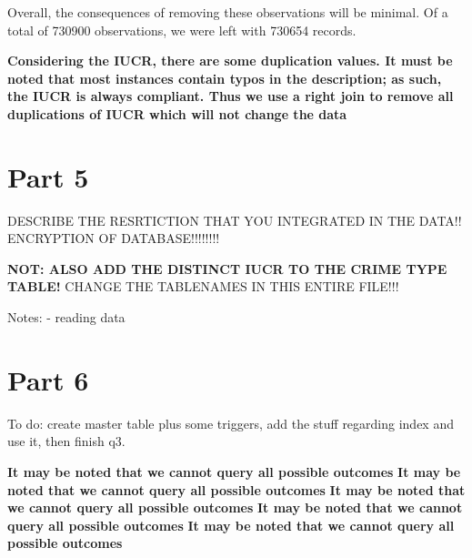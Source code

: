 \documentclass[a4paper]{article}
\begin{document}
Overall, the consequences of removing these observations will be minimal. Of a total of 730900 observations, we were left with 730654 records. 


\textbf{Considering the IUCR, there are some duplication values. It must be noted that most instances contain typos in the description; as such, the IUCR is always compliant. Thus we use a right join to remove all duplications of IUCR which will not change the data}

\section{Part 5}

DESCRIBE THE RESRTICTION THAT YOU INTEGRATED IN THE DATA!!
ENCRYPTION OF DATABASE!!!!!!!!

\textbf{NOT: ALSO ADD THE DISTINCT IUCR TO THE CRIME TYPE TABLE!}
CHANGE THE TABLENAMES IN THIS ENTIRE FILE!!! 


Notes:
- reading data
%
%
%



\section{Part 6}

To do: create master table plus some triggers, add the stuff regarding index and use it, then finish q3.

\textbf{It may be noted that we cannot query all possible outcomes}
\textbf{It may be noted that we cannot query all possible outcomes}
\textbf{It may be noted that we cannot query all possible outcomes}
\textbf{It may be noted that we cannot query all possible outcomes}
\textbf{It may be noted that we cannot query all possible outcomes}
\end{document}
